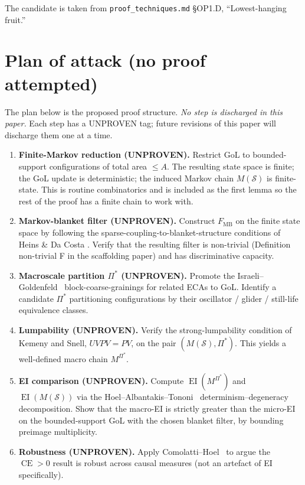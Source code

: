 \documentclass[11pt]{article}
\theoremstyle{plain}
\theoremstyle{definition}
\theoremstyle{remark}
\DeclareMathOperator{\EI}{EI}
\DeclareMathOperator{\CE}{CE}
\begin{document}
The candidate is taken from \texttt{proof\_techniques.md} §OP1.D,
``Lowest-hanging fruit.''

\section{Plan of attack (no proof attempted)}

The plan below is the proposed proof structure. \emph{No step is
discharged in this paper.} Each step has a UNPROVEN tag; future
revisions of this paper will discharge them one at a time.

\begin{enumerate}[leftmargin=2em,itemsep=4pt]
  \item \textbf{Finite-Markov reduction (UNPROVEN).} Restrict GoL to
    bounded-support configurations of total area $\leq A$. The
    resulting state space is finite; the GoL update is deterministic;
    the induced Markov chain $M(\mathcal{S})$ is finite-state. This is
    routine combinatorics and is included as the first lemma so the
    rest of the proof has a finite chain to work with.
  \item \textbf{Markov-blanket filter (UNPROVEN).} Construct
    $F_{\mathrm{MB}}$ on the finite state space by following the
    sparse-coupling-to-blanket-structure conditions of Heins \& Da Costa
    \cite{heins2022sparse}. Verify that the resulting filter is
    non-trivial (Definition non-trivial F in the scaffolding paper)
    and has discriminative capacity.
  \item \textbf{Macroscale partition $\Pi^*$ (UNPROVEN).} Promote the
    Israeli--Goldenfeld~\cite{israeli2004irreducibility,israeli2006coarse}
    block-coarse-grainings for related ECAs to GoL. Identify a
    candidate $\Pi^*$ partitioning configurations by their
    oscillator / glider / still-life equivalence classes.
  \item \textbf{Lumpability (UNPROVEN).} Verify the strong-lumpability
    condition of Kemeny and Snell, $UVPV = PV$, on the pair
    $(M(\mathcal{S}), \Pi^*)$. This yields a well-defined macro
    chain $M^{\Pi^*}$.
  \item \textbf{EI comparison (UNPROVEN).} Compute $\EI(M^{\Pi^*})$
    and $\EI(M(\mathcal{S}))$ via the
    Hoel--Albantakis--Tononi~\cite{hoel2013macro} determinism--degeneracy
    decomposition. Show that the macro-EI is strictly greater than
    the micro-EI on the bounded-support GoL with the chosen blanket
    filter, by bounding preimage multiplicity.
  \item \textbf{Robustness (UNPROVEN).} Apply
    Comolatti--Hoel~\cite{comolatti2022causal} to argue the
    $\CE > 0$ result is robust across causal measures (not an
    artefact of EI specifically).
\end{enumerate}
\end{document}

